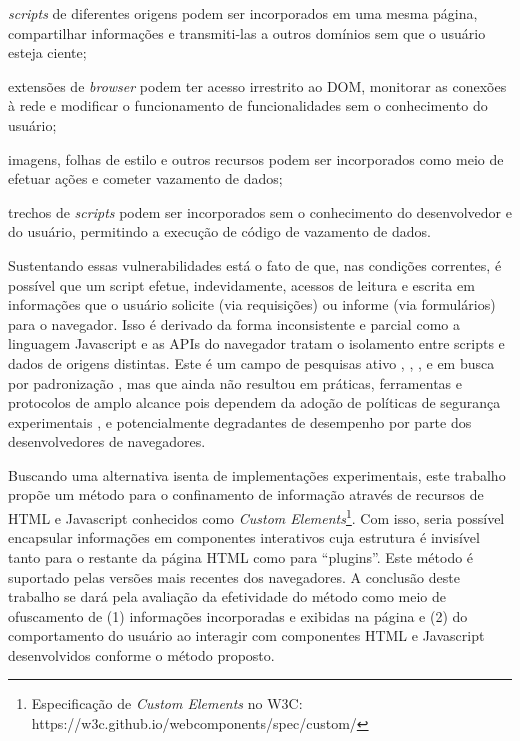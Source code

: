 \begin{alineas}
	\item \textit{scripts} de diferentes origens podem ser incorporados em uma mesma página, compartilhar informações e transmiti-las a outros domínios sem que o usuário esteja ciente;
	\item extensões de \textit{browser} podem ter acesso irrestrito ao DOM, monitorar as conexões à rede e modificar o funcionamento de funcionalidades sem o conhecimento do usuário;
	\item imagens, folhas de estilo e outros recursos podem ser incorporados como meio de efetuar ações e cometer vazamento de dados;
	\item trechos de \textit{scripts} podem ser incorporados sem o conhecimento do desenvolvedor e do usuário, permitindo a execução de código de vazamento de dados.
\end{alineas}

Sustentando essas vulnerabilidades está o fato de que, nas condições correntes, é possível que um script efetue, indevidamente, acessos de leitura e escrita em informações que o usuário solicite (via requisições) ou informe (via formulários) para o navegador. Isso é derivado da forma inconsistente e parcial como a linguagem Javascript e as APIs do navegador tratam o isolamento entre scripts e dados de origens distintas. Este é um campo de pesquisas ativo \cite{Stefan2014}, \cite{Hedin2014}, \cite{Bichhawat2014}, \cite{Magazinius2014} e em busca por padronização \cite{W3C:WebAppSec}, mas que ainda não resultou em práticas, ferramentas e protocolos de amplo alcance pois dependem da adoção de políticas de segurança experimentais \cite{Hedin2014}, \cite{Bichhawat2014} e potencialmente degradantes de desempenho \cite[p. 14]{Stefan2014} por parte dos desenvolvedores de navegadores.

Buscando uma alternativa isenta de implementações experimentais, este trabalho propõe um método para o confinamento de informação através de recursos de HTML e Javascript conhecidos como \textit{Custom Elements}\footnote{Especificação de \textit{Custom Elements} no W3C: https://w3c.github.io/webcomponents/spec/custom/}. Com isso, seria possível encapsular informações em componentes interativos cuja estrutura é invisível tanto para o restante da página HTML como para ``plugins''. Este método é suportado pelas versões mais recentes dos navegadores. A conclusão deste trabalho se dará pela avaliação da efetividade do método como meio de ofuscamento de (1) informações incorporadas e exibidas na página e (2) do comportamento do usuário ao interagir com componentes HTML e Javascript desenvolvidos conforme o método proposto.


